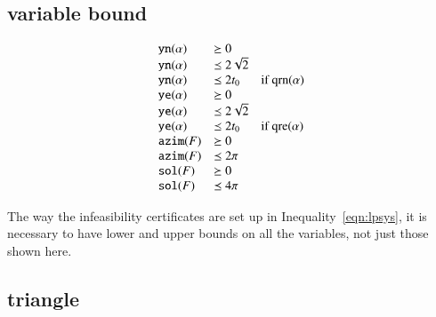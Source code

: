 \subsection{variable bound}
\begin{equation}
    \begin{array}{lll}
        {\operatorname{{\texttt{yn}}}}(\alpha) &\succeq0\\
        {\operatorname{{\texttt{yn}}}}(\alpha) &\preceq 2\sqrt2\\
        {\operatorname{{\texttt{yn}}}}(\alpha) &\preceq 2t_0 &\text{if }
        {\operatorname{qrn}}(\alpha)\\
        {\operatorname{{\texttt{ye}}}}(\alpha)&\succeq0\\
        {\operatorname{{\texttt{ye}}}}(\alpha)&\preceq 2\sqrt2\\
        {\operatorname{{\texttt{ye}}}}(\alpha)&\preceq 2t_0&\text{if }
        {\operatorname{qre}}(\alpha)\\
        {\operatorname{{\texttt{azim}}}}(F) &\succeq 0\\
        {\operatorname{{\texttt{azim}}}}(F) &\preceq 2\pi\\
        {\operatorname{{\texttt{sol}}}}(F) &\succeq 0\\
        {\operatorname{{\texttt{sol}}}}(F) &\preceq 4\pi\\
    \end{array}
\end{equation}





\begin{remark}
The way the infeasibility certificates are set up in
Inequality~\ref{eqn:lpsys}, it is necessary to have lower and
upper bounds on all the variables, not just those shown here.
\end{remark}




\subsection{triangle}

